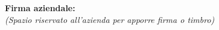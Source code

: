 \vspace*{\fill} %
\noindent
\begin{minipage}{0.60\textwidth}
    {\small
    \textbf{Firma aziendale:}\\[0.3cm]
    \textit{(Spazio riservato all’azienda per apporre firma o timbro)}\\[0.8cm]
    \fbox{\rule{0pt}{2.5cm}\rule{5cm}{0pt}} %
    }
\end{minipage}